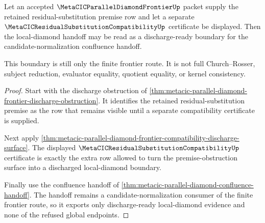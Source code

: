 \begin{theorem}
\label{thm:metacic-parallel-diamond-frontier-residual-substitution-discharge-criterion}
Let an accepted $\MetaCICParallelDiamondFrontierUp$ packet supply the retained residual-substitution premise row and let a separate $\MetaCICResidualSubstitutionCompatibilityUp$ certificate be displayed. Then the local-diamond handoff may be read as a discharge-ready boundary for the candidate-normalization confluence handoff.

This boundary is still only the finite frontier route. It is not full Church--Rosser, subject reduction, evaluator equality, quotient equality, or kernel consistency.
\end{theorem}
\begin{proof}
Start with the discharge obstruction of \autoref{thm:metacic-parallel-diamond-frontier-discharge-obstruction}. It identifies the retained residual-substitution premise as the row that remains visible until a separate compatibility certificate is supplied.

Next apply \autoref{thm:metacic-parallel-diamond-frontier-compatibility-discharge-surface}. The displayed $\MetaCICResidualSubstitutionCompatibilityUp$ certificate is exactly the extra row allowed to turn the premise-obstruction surface into a discharged local-diamond boundary.

Finally use the confluence handoff of \autoref{thm:metacic-parallel-diamond-confluence-handoff}. The handoff remains a candidate-normalization consumer of the finite frontier route, so it exports only discharge-ready local-diamond evidence and none of the refused global endpoints.
\end{proof}
